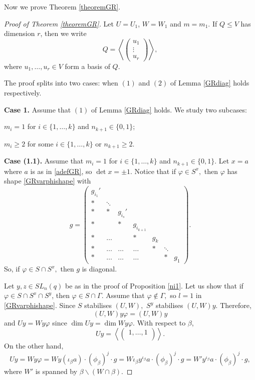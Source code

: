 Now we prove Theorem \ref{theoremGR}.

\begin{proof}[Proof of Theorem {\rm \ref{theoremGR}}]
Let $U=U_1$, $W=W_1$ and $m=m_1.$ If  $Q \le V$ has dimension $r$, then we write 
$$Q= \left \langle 
\begin{pmatrix}
u_1 \\
 \vdots \\
u_r
\end{pmatrix}
\right \rangle,$$
where $u_1, \ldots, u_r \in V$ form a basis of $Q$.

The proof splits into two cases: when $(1)$ and $(2)$ of Lemma \ref{GRdiag} holds respectively.

\medskip

{\bf Case 1.} Assume that $(1)$ of Lemma \ref{GRdiag} holds. We study two subcases:
\begin{description}[before={\renewcommand\makelabel[1]{\bfseries ##1}}]
\item[{\bf Case (1.1)}] $m_i=1$ for $i \in \{1, \ldots, k\}$ and $n_{k+1} \in \{0,1\}$;
\item[{\bf Case (1.2)}] $m_i\ge 2$ for some $i \in \{1, \ldots, k\}$ or $n_{k+1}\ge 2.$
\end{description}

\medskip

{\bf Case (1.1).} Assume that $m_i=1$ for $i \in \{1, \ldots, k\}$ and $n_{k+1} \in \{0,1\}.$ Let $x=a$ where $a$ is as in \eqref{adefGR}, so $\det x = \pm 1$. Notice that if $\varphi \in S^x,$ then $\varphi$  has shape \eqref{GRvarphishape} with 
\begin{equation}
\label{GRginsy}
g= \begin{pmatrix}
g_{i_1}' & & & & & & \\
* & \ddots & & & & &\\
* & *&g_{i_s}' &  & & &\\
* & &* &g_{i_{k+1}} & & & \\
* &\ldots & &* & g_{k} & & \\
* &\ldots &\ldots& \ldots &*  & \ddots &\\
* &\ldots &\ldots &\ldots & &* &  g_{1}
\end{pmatrix}.
\end{equation}
So, if $\varphi \in S \cap S^x,$ then $g$ is diagonal.

 Let $y ,z \in SL_n(q)$ be as in the proof of Proposition \ref{ni1}. Let us show that if $\varphi \in S \cap S^x \cap S^y$, then $\varphi \in S \cap \Gamma.$ Assume that $\varphi \notin \Gamma,$ so $l=1$ in  \eqref{GRvarphishape}.  Since $S$ stabilises $(U,W),$ $S^y$ stabilises $(U,W)y$. Therefore, $$(U,W)y \varphi =(U,W)y$$
and $Uy=Wy\varphi$ since $\dim Uy= \dim Wy\varphi.$ With respect to $\beta$,
$$Uy= \left \langle 
\begin{pmatrix}
1, \ldots, 1 \\
\end{pmatrix}
\right \rangle.$$ On the other hand, 
$$Uy=Wy \varphi =W y (\iota_{\beta} a) \cdot (\phi_{\beta})^j \cdot g =W \iota_{\beta} y^{\iota_{\beta}}a\cdot (\phi_{\beta})^j \cdot g= W'y^{\iota_{\beta}}a\cdot (\phi_{\beta})^j \cdot g,$$
where $W'$ is spanned by $\beta \backslash (W \cap \beta).$ 


\end{proof}
